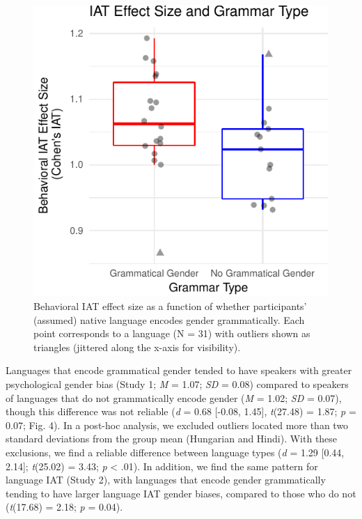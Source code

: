 \documentclass[10pt, letterpaper]{article}
\newenvironment{CodeChunk}{}{}
\begin{document}
\begin{CodeChunk}
\begin{figure}[t]

{\centering \includegraphics{figs/grammatical_gender_plot-1} 

}

\caption[Behavioral IAT effect size as a function of whether participants' (assumed) native language encodes gender grammatically]{Behavioral IAT effect size as a function of whether participants' (assumed) native language encodes gender grammatically. Each point corresponds to a language (N = 31) with outliers shown as triangles (jittered along the x-axis for visibility).}\label{fig:grammatical_gender_plot}
\end{figure}
\end{CodeChunk}

Languages that encode grammatical gender tended to have speakers with
greater psychological gender bias (Study 1; \emph{M} = 1.07; \emph{SD} =
0.08) compared to speakers of languages that do not grammatically encode
gender (\emph{M} = 1.02; \emph{SD} = 0.07), though this difference was
not reliable (\emph{d} = 0.68 {[}-0.08, 1.45{]}, \emph{t}(27.48) = 1.87;
\emph{p} = 0.07; Fig. 4). In a post-hoc analysis, we excluded outliers
located more than two standard deviations from the group mean (Hungarian
and Hindi). With these exclusions, we find a reliable difference between
language types (\emph{d} = 1.29 {[}0.44, 2.14{]}; \emph{t}(25.02) =
3.43; \emph{p} \textless{} .01). In addition, we find the same pattern
for language IAT (Study 2), with languages that encode gender
grammatically tending to have larger language IAT gender biases,
compared to those who do not (\emph{t}(17.68) = 2.18; \emph{p} = 0.04).
\end{document}
